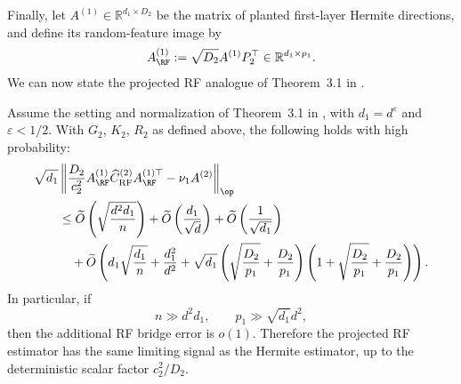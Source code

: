 Finally, let $A^{(1)}\in\mathbb R^{d_1\times D_2}$ be the matrix of planted first-layer Hermite directions, and define its random-feature image by
\begin{align}
    A_{\RF}^{(1)}
    :=
    \sqrt{D_2} 
    A^{(1)}
    P_2^\top
    \in\mathbb R^{d_1\times p_1}.
\end{align}
We can now state the projected RF analogue of Theorem~3.1 in
\cite{tabanelli2026deep}.


\begin{theorem}
\label{2605:thm:rf-hermite-bridge-k2}
Assume the setting and normalization of Theorem~3.1 in
\cite{tabanelli2026deep}, with $d_1=d^\varepsilon$ and
$\varepsilon<1/2$. With $G_2$, $K_2$, $R_2$ as defined above, the following holds with
high probability:
\begin{align}
&\sqrt{d_1}
\left\|
    \frac{D_2}{c_2^2}
    A_{\RF}^{(1)}
    \widehat C_{\rm RF}^{(2)}
    A_{\RF}^{(1)\top}
    -
    \nu_1A^{(2)}
\right\|_{\op}
\nonumber\\
&\qquad\le
\widetilde O \left(
    \sqrt{\frac{d^2d_1}{n}}
\right)
+
\widetilde O \left(
    \frac{d_1}{\sqrt d}
\right)
+
\widetilde O \left(
    \frac1{\sqrt{d_1}}
\right)
\nonumber\\
&\qquad\quad+
\widetilde O \left(
    d_1\sqrt{\frac{d_1}{n}}
    +
    \frac{d_1^2}{d^2}
    +
    \sqrt{d_1} \left(
        \sqrt{\frac{D_2}{p_1}}
        +
        \frac{D_2}{p_1}
    \right)\left(1+
        \sqrt{\frac{D_2}{p_1}}
        +
        \frac{D_2}{p_1}
    \right)
\right).
\label{2605:eq:rf-hermite-final-rate}
\end{align}
In particular, if
\[
    n\gg d^2d_1,
    \qquad
    p_1 \gg \sqrt{d_1}d^2,
\]
then the additional RF bridge error is $o(1)$. Therefore the projected RF
estimator has the same limiting signal as the Hermite estimator, up to
the deterministic scalar factor $c_2^2/D_2$.
\end{theorem}

